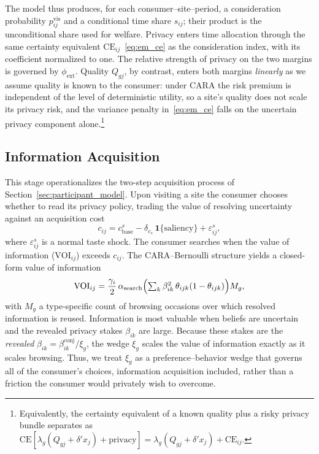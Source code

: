 \documentclass[12pt]{article}
\theoremstyle{definition}
\newcommand{\CE}{\text{CE}}
\newcommand{\VOI}{\text{VOI}}
\theoremstyle{remark}
\begin{document}
{The model thus produces, for each consumer--site--period, a consideration probability $p^{\text{vis}}_{ij}$ and a conditional time share $s_{ij}$; their product is the unconditional share used for welfare. Privacy enters time allocation through the same certainty equivalent $\CE_{ij}$~\eqref{eq:em_ce} as the consideration index, with its coefficient normalized to one. The relative strength of privacy on the two margins is governed by $\phi_{\text{ext}}$. Quality $Q_{gj}$, by contrast, enters both margins \emph{linearly} as we assume quality is known to the consumer: under CARA the risk premium is independent of the level of deterministic utility, so a site's quality does not scale its privacy risk, and the variance penalty in~\eqref{eq:em_ce} falls on the uncertain privacy component alone.\footnote{Equivalently, the certainty equivalent of a known quality plus a risky privacy bundle separates as $\CE[\lambda_g(Q_{gj}+\delta'x_j) + \text{privacy}] = \lambda_g(Q_{gj}+\delta'x_j) + \CE_{ij}$.}

\subsection{Information Acquisition}

This stage operationalizes the two-step acquisition process of Section~\ref{sec:participant_model}. Upon visiting a site the consumer chooses whether to read its privacy policy, trading the value of resolving uncertainty against an acquisition cost
\begin{equation*}
  c_{ij} = c^s_{\text{base}} - \delta_{c_s}\,\mathbf{1}\{\text{saliency}\} + \varepsilon^s_{ij},
\end{equation*}
where $\varepsilon^s_{ij}$ is a normal taste shock. The consumer searches when the value of information ($\VOI_{ij}$) exceeds $c_{ij}$. The CARA--Bernoulli structure yields a closed-form value of information
\begin{equation}\label{eq:em_voi}
  \VOI_{ij} = \frac{\gamma_i}{2}\, \alpha_{\text{search}} \Bigl(\textstyle\sum_k \beta_{ik}^2\, \theta_{ijk}(1 - \theta_{ijk})\Bigr) M_g,
\end{equation}
with $M_g$ a type-specific count of browsing occasions over which resolved information is reused. Information is most valuable when beliefs are uncertain and the revealed privacy stakes $\beta_{ik}$ are large. Because these stakes are the \emph{revealed} $\beta_{ik} = \beta^{\text{conj}}_{ik}/\xi_g$, the wedge $\xi_g$ scales the value of information exactly as it scales browsing. Thus, we treat $\xi_g$ as a preference--behavior wedge that governs all of the consumer's choices, information acquisition included, rather than a friction the consumer would privately wish to overcome. 

}
\end{document}
